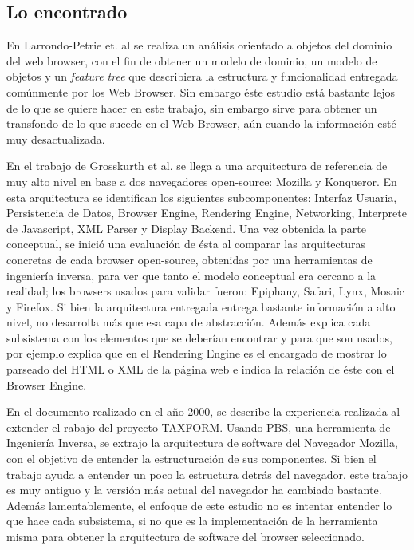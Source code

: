 \subsection{Lo encontrado}
En Larrondo-Petrie et. al \cite{535061} se realiza un análisis orientado a objetos del dominio del web browser, con el fin de obtener un modelo de dominio, un modelo de objetos y un \textit{feature tree} que describiera la estructura y funcionalidad entregada comúnmente por los Web Browser. Sin embargo éste estudio está bastante lejos de lo que se quiere hacer en este trabajo, sin embargo sirve para obtener un transfondo de lo que sucede en el Web Browser, aún cuando la información esté muy desactualizada.


En el trabajo de Grosskurth et al. \cite{2005-grosskurth-browser-refarch, preprint-grosskurth-browser-archevol} se llega a una arquitectura de referencia de muy alto nivel en base a dos navegadores open-source: Mozilla y Konqueror. En esta arquitectura se identifican los siguientes subcomponentes: Interfaz Usuaria, Persistencia de Datos, Browser Engine, Rendering Engine, Networking, Interprete de Javascript, XML Parser y Display Backend. Una vez obtenida la parte conceptual, se inició una evaluación de ésta al comparar las arquitecturas concretas de cada browser open-source, obtenidas por una herramientas de ingeniería inversa, para ver que tanto el modelo conceptual era cercano a la realidad; los browsers usados para validar fueron: Epiphany, Safari, Lynx, Mosaic y Firefox. Si bien la arquitectura entregada entrega bastante información a alto nivel, no desarrolla más que esa capa de abstracción. Además explica cada subsistema con los elementos que se deberían encontrar y para que son usados, por ejemplo explica que en el Rendering Engine es el encargado de mostrar lo parseado del HTML o XML de la página web e indica la relación de éste con el Browser Engine. 


En el documento \cite{Godfrey2000} realizado en el año 2000, se describe la experiencia realizada al extender el rabajo del proyecto TAXFORM. Usando PBS, una herramienta de Ingeniería Inversa, se extrajo la arquitectura de software del Navegador Mozilla, con el objetivo de entender la estructuración de sus componentes. Si bien el trabajo ayuda a entender un poco la estructura detrás del navegador, este trabajo es muy antiguo y la versión más actual del navegador ha cambiado bastante. Además lamentablemente, el enfoque de este estudio no es intentar entender lo que hace cada subsistema, si no que es la implementación de la herramienta misma para obtener la arquitectura de software del browser seleccionado.

